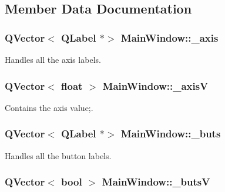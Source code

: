 \subsection{Member Data Documentation}
\hypertarget{class_main_window_a30c99d7a544f74b0650758e5cc7ead5a}{}
\subsubsection[{\+\_\+axis}]{\setlength{\rightskip}{0pt plus 5cm}Q\+Vector$<$ Q\+Label $\ast$$>$ Main\+Window\+::\+\_\+axis\hspace{0.3cm}{\ttfamily [private]}}\label{class_main_window_a30c99d7a544f74b0650758e5cc7ead5a}


Handles all the axis labels. 

\hypertarget{class_main_window_a20f66f574ed4c96d8dfc0013e1095f15}{}
\subsubsection[{\+\_\+axis\+V}]{\setlength{\rightskip}{0pt plus 5cm}Q\+Vector$<$ float $>$ Main\+Window\+::\+\_\+axis\+V\hspace{0.3cm}{\ttfamily [private]}}\label{class_main_window_a20f66f574ed4c96d8dfc0013e1095f15}


Contains the axis value;. 

\hypertarget{class_main_window_a8eaf474e1b8672f32873ed009e28ce8a}{}
\subsubsection[{\+\_\+buts}]{\setlength{\rightskip}{0pt plus 5cm}Q\+Vector$<$ Q\+Label $\ast$$>$ Main\+Window\+::\+\_\+buts\hspace{0.3cm}{\ttfamily [private]}}\label{class_main_window_a8eaf474e1b8672f32873ed009e28ce8a}


Handles all the button labels. 

\hypertarget{class_main_window_a519ae4630572cb63fbd04bce12fe8e77}{}
\subsubsection[{\+\_\+buts\+V}]{\setlength{\rightskip}{0pt plus 5cm}Q\+Vector$<$ bool $>$ Main\+Window\+::\+\_\+buts\+V\hspace{0.3cm}{\ttfamily [private]}}\label{class_main_window_a519ae4630572cb63fbd04bce12fe8e77}



